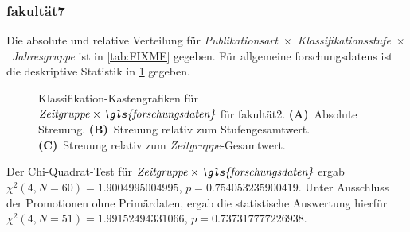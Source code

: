 \subsubsection{\gls{fakultät7}}
Die absolute und relative Verteilung für {\textit{Publikationsart}}~$\times$~{\textit{Klassifikationsstufe}}~$\times$~\textit{Jahresgruppe} ist in \cref{tab:FIXME} gegeben.
Für allgemeine \glspl{forschungsdaten} ist die deskriptive Statistik in \cref{fig:faculty_f_sampled_evaluated_adjusted_factors-only_Zeitgruppe_x_FD_absolute_boxplot} gegeben.
\begin{figure}[!htbp]
    \centering%
    \resizebox{.33\textwidth}{!}{}%
    \resizebox{.33\textwidth}{!}{}%
    \resizebox{.33\textwidth}{!}{}%
    \caption{Klassifikation-Kastengrafiken für $\text{\textit{Zeitgruppe}}\times\text{\textit{\gls{forschungsdaten}}}$ für \gls{fakultät2}. \textbf{(A)}~Absolute Streuung. \textbf{(B)}~Streuung relativ zum Stufengesamtwert. \textbf{(C)}~Streuung relativ zum \textit{Zeitgruppe}-Gesamtwert.}
    \label{fig:faculty_f_sampled_evaluated_adjusted_factors-only_Zeitgruppe_x_FD_absolute_boxplot}
\end{figure}
Der Chi-Quadrat-Test für $\text{\textit{Zeitgruppe}}\times\text{\textit{\gls{forschungsdaten}}}$ ergab $\chi^2 (\num{4}, N = \num{60}) = \num[round-mode=places,round-precision=3]{1.9004995004995}$, $p = \num[round-mode=places,round-precision=3]{0.754053235900419}$.
Unter Ausschluss der Promotionen ohne Primärdaten, ergab die statistische Auswertung hierfür $\chi^2 (\num{4}, N = \num{51}) = \num[round-mode=places,round-precision=3]{1.99152494331066}$, $p = \num[round-mode=places,round-precision=3]{0.737317777226938}$.

